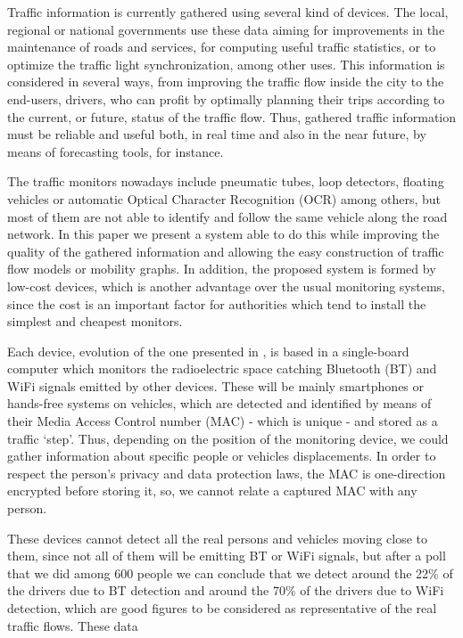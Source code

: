 \documentclass[preprint]{elsarticle}
\begin{document}
Traffic information is currently gathered using several kind of devices. The local, regional or national governments use these data aiming for improvements in the maintenance of roads and services, for computing useful traffic statistics, or to optimize the traffic light synchronization, among other uses. This information is considered in several ways, from improving the traffic flow inside the city to the end-users, drivers, who can profit by optimally planning their trips according to the current, or future, status of the traffic flow. Thus, gathered traffic information must be reliable and useful both, in real time and also in the near future, by means of forecasting tools, for instance.

The traffic monitors nowadays include pneumatic tubes, loop detectors, floating vehicles or automatic Optical Character Recognition (OCR) among others, but most of them are not able to identify and follow the same vehicle along the road network. In this paper we present a system able to do this while improving the quality of the gathered information and allowing the easy construction of traffic flow models or mobility graphs. In addition, the proposed system is formed by low-cost devices, which is another advantage over the usual monitoring systems, since the cost is an important factor for authorities which tend to install the simplest and cheapest monitors.

Each device, evolution of the one presented in \cite{castillo2014_book_sipesca}, is based in a single-board computer which monitors the radioelectric space catching Bluetooth (BT) and WiFi signals emitted by other devices. These will be mainly smartphones or hands-free systems on vehicles, which are detected and identified by means of their Media Access Control number (MAC) - which is unique - and stored as a traffic `step'.
Thus, depending on the position of the monitoring device, we could gather information about specific people or vehicles displacements. In order to respect the person's privacy and data protection laws, the MAC is one-direction encrypted before storing it, so, we cannot relate a captured MAC with any person.

These devices cannot detect all the real persons and vehicles moving close to them, since not all of them will be emitting BT or WiFi signals, but after a poll that we did among 600 people we can conclude that we detect around the 22\% of the drivers due to BT detection and around the 70\% of the drivers due to WiFi detection, which are good figures to be considered as representative of the real traffic flows.
These data
\end{document}
